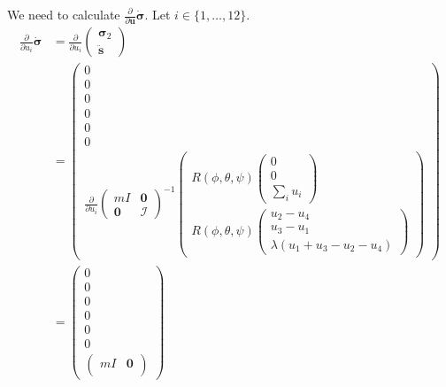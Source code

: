 \documentclass{article}
\begin{document}
We need to calculate $ \frac{\partial}{\partial \bm{u}} \dot{\bm{\sigma}} $. Let $i \in \{1, \ldots, 12\}$.
\begin{equation}
\begin{aligned}
    \frac{\partial}{\partial u_i} \dot{\bm{\sigma}} 
    &= \frac{\partial}{\partial u_i} \begin{pmatrix} \bm{\sigma}_2 \\ \ddot{\bm{s}} \end{pmatrix} \\
    &= \begin{pmatrix}
        0 \\
        0 \\
        0 \\
        0 \\
        0 \\
        0 \\
        \frac{\partial}{\partial u_i} \begin{pmatrix}
            m I & \mathbf{0} \\
            \mathbf{0} & \mathcal{I}
        \end{pmatrix}^{-1}
        \begin{pmatrix}
            R(\phi, \theta, \psi) \begin{pmatrix} 
                0 \\ 
                0 \\ 
                \sum_{i} u_i
            \end{pmatrix} \\
            R(\phi, \theta, \psi) \begin{pmatrix}
                u_2 - u_4 \\ 
                u_3 - u_1 \\ 
                \lambda(u_1 + u_3 - u_2 - u_4) 
            \end{pmatrix}
        \end{pmatrix}
    \end{pmatrix} \\
    &= \begin{pmatrix}
        0 \\
        0 \\
        0 \\
        0 \\
        0 \\
        0 \\
        \begin{pmatrix}
            m I & \mathbf{0} \\

\end{pmatrix}
\end{pmatrix}
\end{aligned}
\end{equation}
\end{document}
